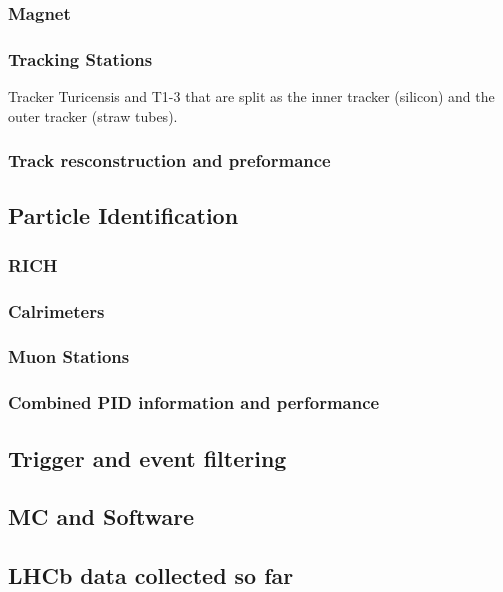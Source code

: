 \subsubsection{Magnet}

\subsubsection{Tracking Stations} %
Tracker Turicensis and T1-3 that are split as the inner tracker (silicon) and the outer tracker (straw tubes).
\subsubsection{Track resconstruction and preformance}


\subsection{Particle Identification}
\subsubsection{RICH}
\subsubsection{Calrimeters}
\subsubsection{Muon Stations}
\subsubsection{Combined PID information and performance}

\subsection{Trigger and event filtering}

\subsection{MC and Software}

\subsection{LHCb data collected so far}

